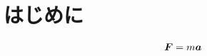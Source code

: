 \documentclass[dvipdfmx,a4j,11pt]{jsarticle}
\begin{document}

\newpage 
\tableofcontents
\newpage

\section*{はじめに}

\begin{align}
  \vb*{F} = m \vb*{a}
\end{align}
\end{document}
